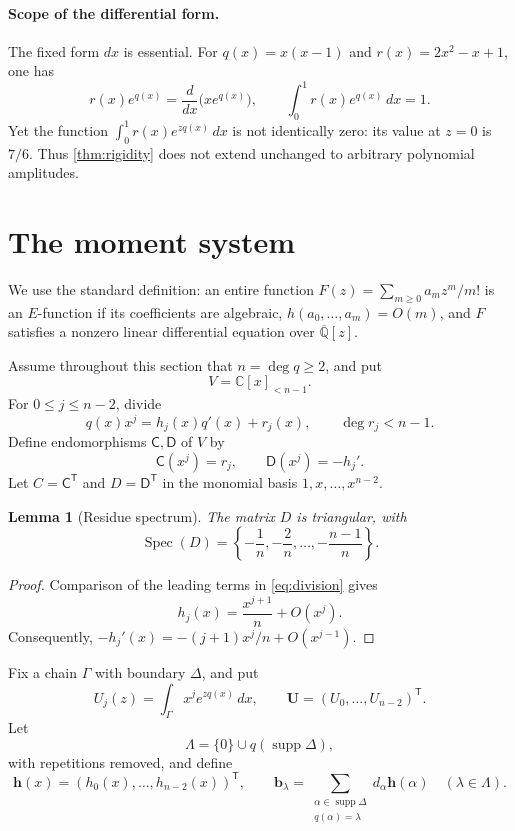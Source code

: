 \documentclass[11pt]{article}
\numberwithin{equation}{section}
\newtheorem{lemma}[lemma]{Lemma}
\theoremstyle{definition}
\theoremstyle{remark}
\newcommand{\C}{\mathbb C}
\newcommand{\Qbar}{\overline{\mathbb Q}}
\newcommand{\Spec}{\operatorname{Spec}}
\newcommand{\supp}{\operatorname{supp}}
\begin{document}
\paragraph{Scope of the differential form.}
The fixed form $dx$ is essential.  For $q(x)=x(x-1)$ and
$r(x)=2x^2-x+1$, one has
\[
  r(x)e^{q(x)}=\frac{d}{dx}\bigl(xe^{q(x)}\bigr),
  \qquad \int_0^1 r(x)e^{q(x)}\,dx=1.
\]
Yet the function $\int_0^1 r(x)e^{zq(x)}\,dx$ is not identically zero:
its value at $z=0$ is $7/6$.  Thus \cref{thm:rigidity} does not extend
unchanged to arbitrary polynomial amplitudes.

\section{The moment system}

We use the standard definition: an entire function
$F(z)=\sum_{m\ge0}a_m z^m/m!$ is an $E$-function if its coefficients are
algebraic, $h(a_0,\ldots,a_m)=O(m)$, and $F$ satisfies a nonzero linear
differential equation over $\Qbar[z]$.

Assume throughout this section that $n=\deg q\ge2$, and put
\[
  V=\C[x]_{<n-1}.
\]
For $0\le j\le n-2$, divide
\begin{equation}\label{eq:division}
  q(x)x^j=h_j(x)q'(x)+r_j(x),
  \qquad \deg r_j<n-1.
\end{equation}
Define endomorphisms $\mathsf C,\mathsf D$ of $V$ by
\[
  \mathsf C(x^j)=r_j,
  \qquad
  \mathsf D(x^j)=-h_j'.
\]
Let $C=\mathsf C^{\mathsf T}$ and $D=\mathsf D^{\mathsf T}$ in the
monomial basis $1,x,\ldots,x^{n-2}$.

\begin{lemma}[Residue spectrum]\label{lem:D-spectrum}
The matrix $D$ is triangular, with
\begin{equation}\label{eq:D-spectrum}
  \Spec(D)=
  \left\{-\frac1n,-\frac2n,\ldots,-\frac{n-1}{n}\right\}.
\end{equation}
\end{lemma}

\begin{proof}
Comparison of the leading terms in \eqref{eq:division} gives
\[
  h_j(x)=\frac{x^{j+1}}n+O(x^j).
\]
Consequently,
$-h_j'(x)=-(j+1)x^j/n+O(x^{j-1})$.
\end{proof}

Fix a chain $\Gamma$ with boundary $\Delta$, and put
\begin{equation}\label{eq:U}
  U_j(z)=\int_\Gamma x^j e^{zq(x)}\,dx,
  \qquad
  \mathbf U=(U_0,\ldots,U_{n-2})^{\mathsf T}.
\end{equation}
Let
\begin{equation}\label{eq:Lambda}
  \Lambda=\{0\}\cup q(\supp\Delta),
\end{equation}
with repetitions removed, and define
\[
  \mathbf h(x)=(h_0(x),\ldots,h_{n-2}(x))^{\mathsf T},
  \qquad
  \mathbf b_\lambda=
  \sum_{\substack{\alpha\in\supp\Delta\\q(\alpha)=\lambda}}
     d_\alpha\mathbf h(\alpha)
  \quad(\lambda\in\Lambda).
\]
\end{document}
